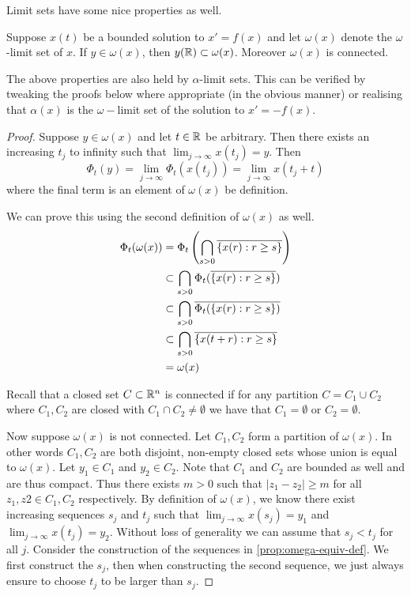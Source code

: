 Limit sets have some nice properties as well. 
\begin{proposition}\label{prop:omega-properties}
Suppose $x(t)$ be a bounded solution to $x' = f(x)$ and let $\omega(x)$ denote the $\omega$-limit set of $x$. If $y \in \omega(x)$, then $y(\mathbb{R}) \subset \omega(x)$. Moreover $\omega(x)$ is connected.
\end{proposition}
\begin{remark}
The above properties are also held by $\alpha$-limit sets. This can be verified by tweaking the proofs below where appropriate (in the obvious manner) or realising that $\alpha(x)$ is the $\omega-$limit set of the solution to $x' = -f(x)$.
\end{remark}
\begin{proof}
Suppose $y \in \omega(x)$ and let $t \in \mathbb{R}$ be arbitrary. Then there exists an increasing $t_j$ to infinity such that $\lim_{j \to \infty} x(t_j) = y$. Then
$$ \Phi_t(y) = \lim_{j \to \infty} \Phi_t(x(t_j)) = \lim_{j \to \infty} x(t_j + t) $$
where the final term is an element of $\omega(x)$ be definition.

We can prove this using the second definition of $\omega(x)$ as well.
\begin{align*}
    \Phi_t(\omega(x)) &= \Phi_t \left( \bigcap_{s > 0} \overline{\{x(r): r \geq s\}} \right)\\
    &\subset \bigcap_{s > 0} \Phi_t (\overline{\{x(r) : r \geq s\}})\\
    &\subset \bigcap_{s > 0} \overline{ \Phi_t(\{x(r): r \geq s\}) }\\
    &\subset \bigcap_{s > 0} \overline{\{x(t + r): r \geq s\}}\\
    &= \omega(x)
\end{align*}

Recall that a closed set $C \subset \mathbb{R}^n$ is connected if for any partition $C = C_1 \cup C_2$ where $C_1, C_2$ are closed with $C_1 \cap C_2 \neq \emptyset$ we have that $C_1 = \emptyset$ or $C_2 = \emptyset$.

Now suppose $\omega(x)$ is not connected. Let $C_1, C_2$ form a partition of $\omega(x)$. In other words $C_1, C_2$ are both disjoint, non-empty closed sets whose union is equal to $\omega(x)$. Let $y_1 \in C_1$ and $y_2 \in C_2$. Note that $C_1$ and $C_2$ are bounded as well and are thus compact. Thus there exists $m > 0$ such that $|z_1 - z_2| \geq m$ for all $z_1, z2 \in C_1, C_2$ respectively. By definition of $\omega(x)$, we know there exist increasing sequences $s_j$ and $t_j$ such that $\lim_{j \to \infty} x(s_j) = y_1$ and $\lim_{j \to \infty} x(t_j) = y_2$.  Without loss of generality we can assume that $s_j < t_j$ for all $j$. Consider the construction of the sequences in \autoref{prop:omega-equiv-def}. We first construct the $s_j$, then when constructing the second sequence, we just always ensure to choose $t_j$ to be larger than $s_j$.


\end{proof}
